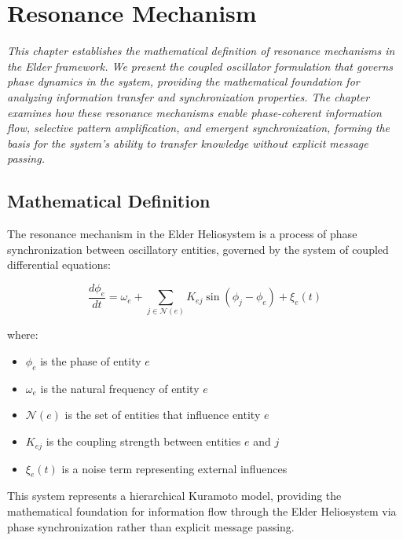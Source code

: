 \chapter{Resonance Mechanism}

\textit{This chapter establishes the mathematical definition of resonance mechanisms in the Elder framework. We present the coupled oscillator formulation that governs phase dynamics in the system, providing the mathematical foundation for analyzing information transfer and synchronization properties. The chapter examines how these resonance mechanisms enable phase-coherent information flow, selective pattern amplification, and emergent synchronization, forming the basis for the system's ability to transfer knowledge without explicit message passing.}

\section{Mathematical Definition}

\begin{definition}
The resonance mechanism in the Elder Heliosystem is a process of phase synchronization between oscillatory entities, governed by the system of coupled differential equations:

\begin{equation}
\frac{d\phi_e}{dt} = \omega_e + \sum_{j \in \mathcal{N}(e)} K_{ej} \sin(\phi_j - \phi_e) + \xi_e(t)
\end{equation}

where:
\begin{itemize}
    \item $\phi_e$ is the phase of entity $e$
    \item $\omega_e$ is the natural frequency of entity $e$
    \item $\mathcal{N}(e)$ is the set of entities that influence entity $e$
    \item $K_{ej}$ is the coupling strength between entities $e$ and $j$
    \item $\xi_e(t)$ is a noise term representing external influences
\end{itemize}
\end{definition}

This system represents a hierarchical Kuramoto model, providing the mathematical foundation for information flow through the Elder Heliosystem via phase synchronization rather than explicit message passing.

